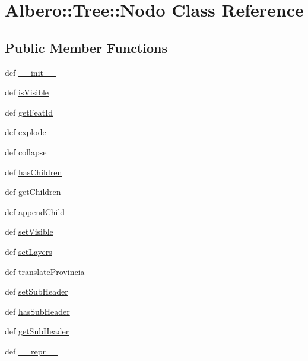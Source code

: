 \hypertarget{classAlbero_1_1Tree_1_1Nodo}{
\section{Albero::Tree::Nodo Class Reference}
\label{classAlbero_1_1Tree_1_1Nodo}
}
\subsection*{Public Member Functions}
\begin{DoxyCompactItemize}
\item 
def \hyperlink{classAlbero_1_1Tree_1_1Nodo_a2e7665cc0e2c6bf1697bdf0f7b344cce}{\_\-\_\-init\_\-\_\-}
\item 
def \hyperlink{classAlbero_1_1Tree_1_1Nodo_adbccef9566f5f00c17bd10b85fe04a0c}{isVisible}
\item 
def \hyperlink{classAlbero_1_1Tree_1_1Nodo_add737c041642bc0ef8cf76ef0f9c6419}{getFeatId}
\item 
def \hyperlink{classAlbero_1_1Tree_1_1Nodo_a26dbbd82182646c9321fff060efdbd56}{explode}
\item 
def \hyperlink{classAlbero_1_1Tree_1_1Nodo_a2a24ef7845001f9ceb749e659f222665}{collapse}
\item 
def \hyperlink{classAlbero_1_1Tree_1_1Nodo_aa310b8748a6cf6c5272a2ae1ae4e7e40}{hasChildren}
\item 
def \hyperlink{classAlbero_1_1Tree_1_1Nodo_a3451a69137c6fc08c5eaf0b405b1d61d}{getChildren}
\item 
def \hyperlink{classAlbero_1_1Tree_1_1Nodo_a964c3310e705ed86363acb8882274a2d}{appendChild}
\item 
def \hyperlink{classAlbero_1_1Tree_1_1Nodo_a20e47dfad0174eea417d2e30ddd3d9a4}{setVisible}
\item 
def \hyperlink{classAlbero_1_1Tree_1_1Nodo_a27774773a9c8c0a2768249eef53810fc}{setLayers}
\item 
def \hyperlink{classAlbero_1_1Tree_1_1Nodo_a9461617d92cdba9bbda9847daa91c69d}{translateProvincia}
\item 
def \hyperlink{classAlbero_1_1Tree_1_1Nodo_a90a4a9e5d5a41daf963423fb9d321f40}{setSubHeader}
\item 
def \hyperlink{classAlbero_1_1Tree_1_1Nodo_ae7dba5b22e6a5aa71088bf639e66c2e5}{hasSubHeader}
\item 
def \hyperlink{classAlbero_1_1Tree_1_1Nodo_a71720d3e52be843f277db0102faa979e}{getSubHeader}
\item 
def \hyperlink{classAlbero_1_1Tree_1_1Nodo_aba7565dd7f81f8ebdd32e81a1dca82d4}{\_\-\_\-repr\_\-\_\-}

\end{DoxyCompactItemize}
